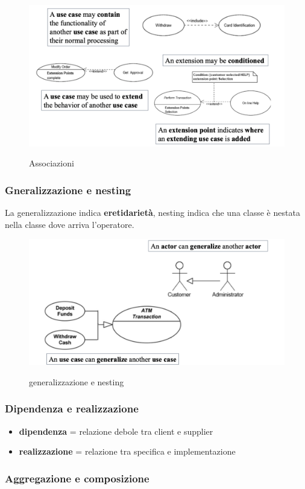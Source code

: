 \documentclass{article}
\begin{document}
\begin{figure}[h!]
    \centering
    \includegraphics[width=0.5\linewidth]{imgs/5 - associazione.png}
    \label{fig:associazione}
    \caption{Associazioni}
\end{figure}

\pagebreak
\subsubsection{Gneralizzazione e nesting}

La generalizzazione indica \textbf{eretidarietà}, nesting indica che una classe 
è nestata nella classe dove arriva l'operatore.

\begin{figure}[h!]
    \centering
    \includegraphics[width=0.5\linewidth]{imgs/6 - generalizzazione e nesting.png}
    \label{fig:generalizzazione_nest}
    \caption{generalizzazione e nesting}
\end{figure}

\subsubsection{Dipendenza e realizzazione}
\begin{itemize}
    \item \textbf{dipendenza} = relazione debole tra client e supplier
    \item \textbf{realizzazione} = relazione tra specifica e implementazione
\end{itemize}

\subsubsection{Aggregazione e composizione}
\end{document}
